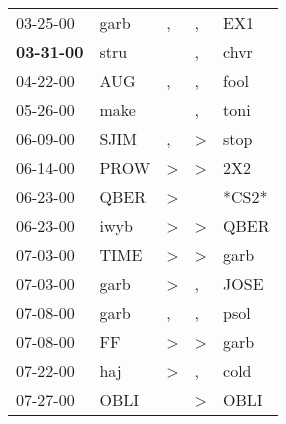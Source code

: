 \begin{supertabular}{p{0.07\textwidth}p{0.06\textwidth}p{0.02\textwidth}p{0.02\textwidth}p{0.06\textwidth}}
          03-25-00\textsuperscript{} &           garb\textsuperscript{} &                , &                , &            EX1\textsuperscript{} \\
 \textbf{03-31-00\textsuperscript{}} &           stru\textsuperscript{} &                  &                , &           chvr\textsuperscript{} \\
          04-22-00\textsuperscript{} &            AUG\textsuperscript{} &                , &                , &           fool\textsuperscript{} \\
          05-26-00\textsuperscript{} &           make\textsuperscript{} &                  &                , &           toni\textsuperscript{} \\
          06-09-00\textsuperscript{} &           SJIM\textsuperscript{} &                , &     \textgreater &           stop\textsuperscript{} \\
          06-14-00\textsuperscript{} &           PROW\textsuperscript{} &     \textgreater &     \textgreater &            2X2\textsuperscript{} \\
          06-23-00\textsuperscript{} &           QBER\textsuperscript{} &     \textgreater &                  &                            *CS2* \\
          06-23-00\textsuperscript{} &           iwyb\textsuperscript{} &     \textgreater &     \textgreater &           QBER\textsuperscript{} \\
          07-03-00\textsuperscript{} &           TIME\textsuperscript{} &     \textgreater &     \textgreater &           garb\textsuperscript{} \\
          07-03-00\textsuperscript{} &           garb\textsuperscript{} &     \textgreater &                , &           JOSE\textsuperscript{} \\
          07-08-00\textsuperscript{} &           garb\textsuperscript{} &                , &                , &           psol\textsuperscript{} \\
          07-08-00\textsuperscript{} &             FF\textsuperscript{} &     \textgreater &     \textgreater &           garb\textsuperscript{} \\
          07-22-00\textsuperscript{} &            haj\textsuperscript{} &     \textgreater &                , &           cold\textsuperscript{} \\
          07-27-00\textsuperscript{} &           OBLI\textsuperscript{} &                  &     \textgreater &           OBLI\textsuperscript{} \\

\end{supertabular}
